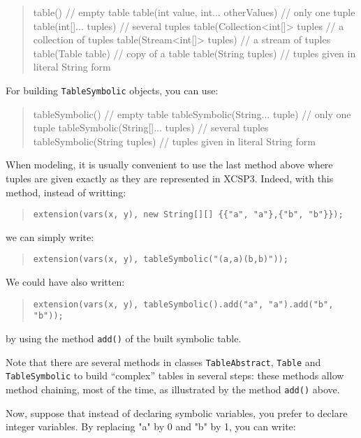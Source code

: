 \documentclass[10pt]{article}
\def\xt{{\rm XCSP3}\xspace}
\newcommand{\nn}[1]{{\tt #1}} %
\def\xt{{\rm XCSP3}\xspace}
\newenvironment{myvb}{\endgraf\small\verbatim}{\endverbatim}
\begin{document}
\begin{quote}
\begin{myvb}
table()                               // empty table
table(int value, int... otherValues)  // only one tuple
table(int[]... tuples)                // several tuples
table(Collection<int[]> tuples        // a collection of tuples
table(Stream<int[]> tuples)           // a stream of tuples
table(Table table)                    // copy of a table
table(String tuples)                  // tuples given in literal String form
\end{myvb}
\end{quote}

For building \nn{TableSymbolic} objects, you can use: 

\begin{quote}
\begin{myvb}
tableSymbolic()                   // empty table
tableSymbolic(String... tuple)    // only one tuple
tableSymbolic(String[]... tuples) // several tuples 
tableSymbolic(String tuples)      // tuples given in literal String form
\end{myvb}
\end{quote}

When modeling, it is usually convenient to use the last method above where tuples are given exactly as they are represented in \xt.
Indeed, with this method, instead of writting:
\begin{quote}
  \verb!extension(vars(x, y), new String[][] {{"a", "a"},{"b", "b"}});!
\end{quote}
we can simply write:
\begin{quote}
  \verb!extension(vars(x, y), tableSymbolic("(a,a)(b,b)"));!
\end{quote}

We could have also written:
\begin{quote}
  \verb!extension(vars(x, y), tableSymbolic().add("a", "a").add("b", "b"));!
\end{quote}
by using the method \nn{add()} of the built symbolic table.

  
Note that there are several methods in classes \nn{TableAbstract}, \nn{Table} and \nn{TableSymbolic} to build ``complex'' tables in several steps: these methods allow method chaining, most of the time, as illustrated by the method \nn{add()} above.

Now, suppose that instead of declaring symbolic variables, you prefer to declare integer variables.
By replacing "a" by 0 and "b" by 1, you can write:
\end{document}
